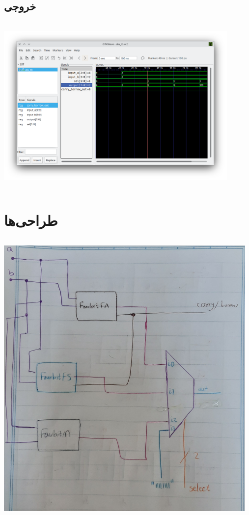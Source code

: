 \documentclass[dvipsnames, svgnames, x11names, a4paper, 11pt, oneside]{book}
\begin{document}
				\subsection{خروجی }
					\begin{center}
						\includegraphics[width=12cm, height=9cm]{./images/alu_vcd}
					\end{center}
			\section{طراحی‌ها}
				\begin{center}
					\includegraphics[width=13cm, height=15cm]{./images/alu}
				\end{center}
\end{document}
